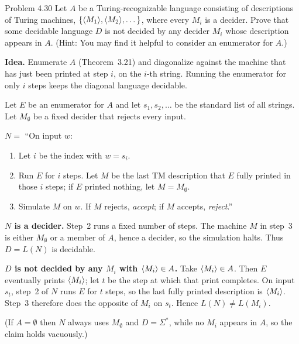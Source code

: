 \begin{question}{Problem 4.30}
Let $A$ be a Turing-recognizable language consisting of descriptions of Turing machines, $\{\langle M_1\rangle,\langle M_2\rangle,\dots\}$, where every $M_i$ is a decider. Prove that some decidable language $D$ is not decided by any decider $M_i$ whose description appears in $A$. (Hint: You may find it helpful to consider an enumerator for $A$.)
\end{question}
\begin{soln}
\textbf{Idea.} Enumerate $A$ (Theorem~3.21) and diagonalize against the machine that has just been printed at step $i$, on the $i$-th string. Running the enumerator for only $i$ steps keeps the diagonal language decidable.

Let $E$ be an enumerator for $A$ and let $s_1,s_2,\dots$ be the standard list of all strings. Let $M_\emptyset$ be a fixed decider that rejects every input.

$N=$ ``On input $w$:
\begin{enumerate}
\item Let $i$ be the index with $w=s_i$.
\item Run $E$ for $i$ steps. Let $M$ be the last TM description that $E$ fully printed in those $i$ steps; if $E$ printed nothing, let $M=M_\emptyset$.
\item Simulate $M$ on $w$. If $M$ rejects, \emph{accept}; if $M$ accepts, \emph{reject}.''
\end{enumerate}

\textbf{$N$ is a decider.} Step~2 runs a fixed number of steps. The machine $M$ in step~3 is either $M_\emptyset$ or a member of $A$, hence a decider, so the simulation halts. Thus $D=L(N)$ is decidable.

\textbf{$D$ is not decided by any $M_i$ with $\langle M_i\rangle\in A$.} Take $\langle M_i\rangle\in A$. Then $E$ eventually prints $\langle M_i\rangle$; let $t$ be the step at which that print completes. On input $s_t$, step~2 of $N$ runs $E$ for $t$ steps, so the last fully printed description is $\langle M_i\rangle$. Step~3 therefore does the opposite of $M_i$ on $s_t$. Hence $L(N)\neq L(M_i)$.

(If $A=\emptyset$ then $N$ always uses $M_\emptyset$ and $D=\Sigma^*$, while no $M_i$ appears in $A$, so the claim holds vacuously.)
\end{soln}

